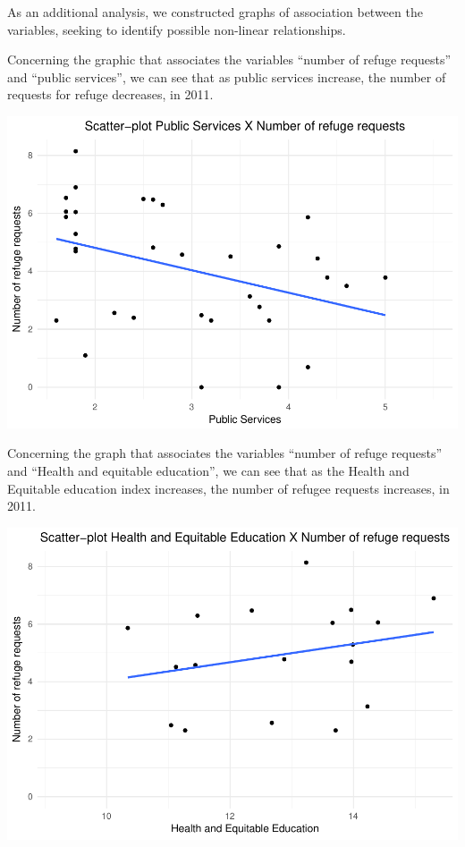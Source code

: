 \documentclass[]{elsarticle} %
\makeatletter
\def\maxwidth{\ifdim\Gin@nat@width>\linewidth\linewidth
\else\Gin@nat@width\fi}
\let\Oldincludegraphics\includegraphics
\renewcommand{\includegraphics}[1]{\Oldincludegraphics[width=\maxwidth]{#1}}
\makeatother
\begin{document}
As an additional analysis, we constructed graphs of association between
the variables, seeking to identify possible non-linear relationships.

Concerning the graphic that associates the variables ``number of refuge
requests'' and ``public services'', we can see that as public services
increase, the number of requests for refuge decreases, in 2011.

\includegraphics{refugees-stephanie_files/figure-latex/model_1_1-1.pdf}

Concerning the graph that associates the variables ``number of refuge
requests'' and ``Health and equitable education'', we can see that as
the Health and Equitable education index increases, the number of
refugee requests increases, in 2011.

\includegraphics{refugees-stephanie_files/figure-latex/model_1_2-1.pdf}
\end{document}
